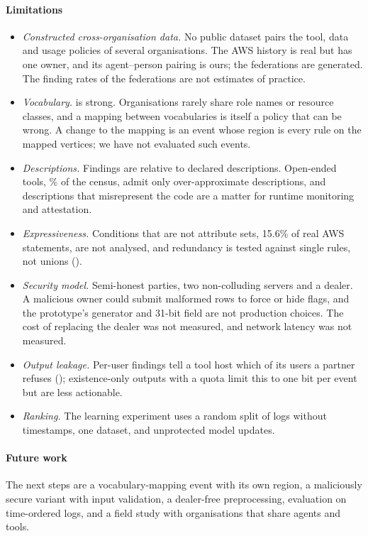 \paragraph{Limitations}
\begin{itemize}
\item \emph{Constructed cross-organisation data.} No public dataset pairs the tool, data and usage policies of several organisations. The AWS history is real but has one owner, and its agent--person pairing is ours; the federations are generated. The finding rates of the federations are not estimates of practice.
\item \emph{Vocabulary.}  is strong. Organisations rarely share role names or resource classes, and a mapping between vocabularies is itself a policy that can be wrong. A change to the mapping is an event whose region is every rule on the mapped vertices; we have not evaluated such events.
\item \emph{Descriptions.} Findings are relative to declared descriptions. Open-ended tools, \csOpenPct\% of the census, admit only over-approximate descriptions, and descriptions that misrepresent the code are a matter for runtime monitoring and attestation.
\item \emph{Expressiveness.} Conditions that are not attribute sets, 15.6\% of real AWS statements, are not analysed, and redundancy is tested against single rules, not unions ().
\item \emph{Security model.} Semi-honest parties, two non-colluding servers and a dealer. A malicious owner could submit malformed rows to force or hide flags, and the prototype's generator and 31-bit field are not production choices. The cost of replacing the dealer was not measured, and network latency was not measured.
\item \emph{Output leakage.} Per-user findings tell a tool host which of its users a partner refuses (); existence-only outputs with a quota limit this to one bit per event but are less actionable.
\item \emph{Ranking.} The learning experiment uses a random split of logs without timestamps, one dataset, and unprotected model updates.
\end{itemize}

\paragraph{Future work} The next steps are a vocabulary-mapping event with its own region, a maliciously secure variant with input validation, a dealer-free preprocessing, evaluation on time-ordered logs, and a field study with organisations that share agents and tools.

